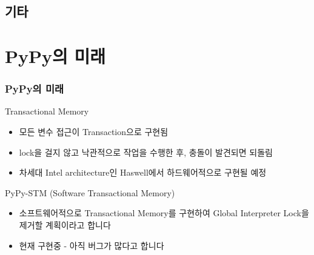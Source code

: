 \documentclass[slidestop]{beamer}
\begin{document}
\subsection{기타}

\section{PyPy의 미래}
\begin{frame}[fragile]
\begin{slide}
\frametitle{PyPy의 미래}
  Transactional Memory
  \begin{itemize}
    \item 모든 변수 접근이 Transaction으로 구현됨
    \item lock을 걸지 않고 낙관적으로 작업을 수행한 후, 충돌이 발견되면 되돌림
    \item 차세대 Intel architecture인 Haswell에서 하드웨어적으로 구현될 예정
  \end{itemize}
  PyPy-STM (Software Transactional Memory)
  \begin{itemize}
    \item 소프트웨어적으로 Transactional Memory를 구현하여 Global Interpreter Lock을 제거할 계획이라고 합니다
    \item 현재 구현중 - 아직 버그가 많다고 합니다
  \end{itemize}

\end{slide}
\end{frame}
\end{document}
